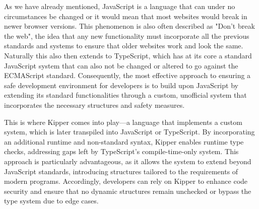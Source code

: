 As we have already mentioned, JavaScript is a language that can under no circumstances be changed or it would mean that most websites would break in newer browser versions. This phenomenon is also often described as "Don't break the web", the idea that any new functionality must incorporate all the previous standards and systems to ensure that older websites work and look the same. Naturally this also then extends to TypeScript, which has at its core a standard JavaScript system that can also not be changed or altered to go against the ECMAScript standard. Consequently, the most effective approach to ensuring a safe development environment for developers is to build upon JavaScript by extending its standard functionalities through a custom, unofficial system that incorporates the necessary structures and safety measures.

This is where Kipper comes into play—a language that implements a custom system, which is later transpiled into JavaScript or TypeScript. By incorporating an additional runtime and non-standard syntax, Kipper enables runtime type checks, addressing gaps left by TypeScript's compile-time-only system. This approach is particularly advantageous, as it allows the system to extend beyond JavaScript standards, introducing structures tailored to the requirements of modern programs. Accordingly, developers can rely on Kipper to enhance code security and ensure that no dynamic structures remain unchecked or bypass the type system due to edge cases.

